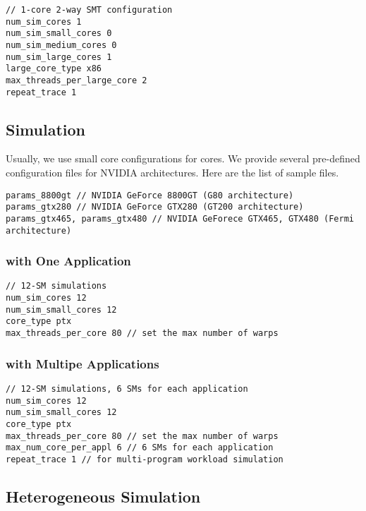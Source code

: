 \smallskip
\begin{lstlisting}
// 1-core 2-way SMT configuration
num_sim_cores 1
num_sim_small_cores 0
num_sim_medium_cores 0
num_sim_large_cores 1
large_core_type x86
max_threads_per_large_core 2
repeat_trace 1
\end{lstlisting}
\smallskip



\subsection{\gpu Simulation}

Usually, we use small core configurations for \gpu cores. We provide
several pre-defined configuration files for NVIDIA architectures. Here
are the list of sample files.

\smallskip
\begin{lstlisting}
params_8800gt // NVIDIA GeForce 8800GT (G80 architecture)
params_gtx280 // NVIDIA GeForce GTX280 (GT200 architecture)
params_gtx465, params_gtx480 // NVIDIA GeForece GTX465, GTX480 (Fermi architecture)
\end{lstlisting}
\smallskip

\subsubsection{\gpu with One Application}
\smallskip
\begin{lstlisting}
// 12-SM simulations
num_sim_cores 12
num_sim_small_cores 12
core_type ptx
max_threads_per_core 80 // set the max number of warps 
\end{lstlisting}
\smallskip



\subsubsection{\gpu with Multipe Applications}

\smallskip
\begin{lstlisting}
// 12-SM simulations, 6 SMs for each application
num_sim_cores 12
num_sim_small_cores 12
core_type ptx
max_threads_per_core 80 // set the max number of warps 
max_num_core_per_appl 6 // 6 SMs for each application
repeat_trace 1 // for multi-program workload simulation
\end{lstlisting}
\smallskip


\subsection{Heterogeneous Simulation}

